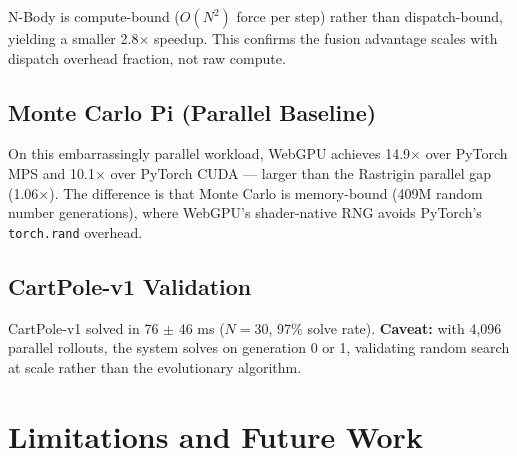\documentclass[sigconf,nonacm]{acmart}
\begin{document}
N-Body is compute-bound ($O(N^2)$ force per step) rather than dispatch-bound, yielding a smaller 2.8$\times$ speedup. This confirms the fusion advantage scales with dispatch overhead fraction, not raw compute.

\subsection{Monte Carlo Pi (Parallel Baseline)}

\begin{table}[h]
\caption{Monte Carlo Pi (4,096 workers $\times$ 100K samples, parallel)}
\label{tab:montecarlo}
\end{table}

On this embarrassingly parallel workload, WebGPU achieves 14.9$\times$ over PyTorch MPS and 10.1$\times$ over PyTorch CUDA --- larger than the Rastrigin parallel gap (1.06$\times$). The difference is that Monte Carlo is memory-bound (409M random number generations), where WebGPU's shader-native RNG avoids PyTorch's \texttt{torch.rand} overhead.

\subsection{CartPole-v1 Validation}

CartPole-v1 solved in 76 $\pm$ 46 ms ($N = 30$, 97\% solve rate). \textbf{Caveat:} with 4,096 parallel rollouts, the system solves on generation 0 or 1, validating random search at scale rather than the evolutionary algorithm.

\section{Limitations and Future Work}
\end{document}
